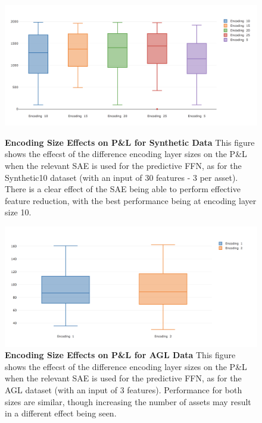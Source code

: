 \documentclass[a4paper,latin]{paper}
\begin{document}
\begin{figure}[H]
	\centering
	\begin{minipage}{0.45\textwidth}
		\centering \includegraphics[scale=0.3]{images/iteration_five/it5_encoding_size_synthetic10.png}
		\caption{\textbf{Encoding Size Effects on P\&L for Synthetic Data} 
			\newline This figure shows the effecst of the difference encoding layer sizes on the P\&L when the relevant SAE is used for the predictive FFN, as for the Synthetic10 dataset (with an input of 30 features - 3 per asset). There is a clear effect of the SAE being able to perform effective feature reduction, with the best performance being at encoding layer size 10.}
		\label{figure-it5_encoding_size_synthetic10}
	\end{minipage}\hfill
	\begin{minipage}{0.45\textwidth}
		\centering \includegraphics[scale=0.3]{images/iteration_five/it5_encoding_size_agl.png}
		\caption{\textbf{Encoding Size Effects on P\&L for AGL Data} 
			\newline This figure shows the effecst of the difference encoding layer sizes on the P\&L when the relevant SAE is used for the predictive FFN, as for the AGL dataset (with an input of 3 features). Performance for both sizes are similar, though increasing the number of assets may result in a different effect being seen.}
		\label{figure-it5_encoding_size_agl}
	\end{minipage}
\end{figure}
\end{document}
